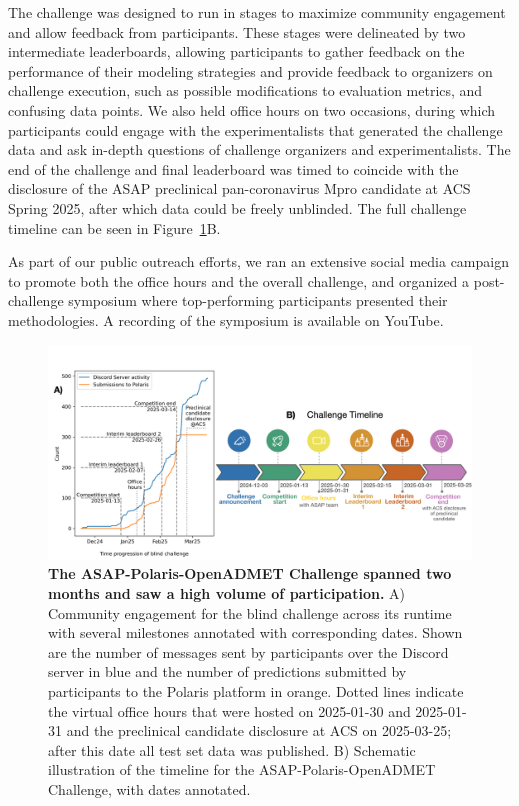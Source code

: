 \documentclass[journal=jcim,manuscript=article]{achemso}
\begin{document}
The challenge was designed to run in stages to maximize community engagement and allow feedback from participants. These stages were delineated by two intermediate leaderboards, allowing participants to gather feedback on the performance of their modeling strategies and provide feedback to organizers on challenge execution, such as possible modifications to evaluation metrics, and confusing data points. We also held office hours on two occasions, during which participants could engage with the experimentalists that generated the challenge data and ask in-depth questions of challenge organizers and experimentalists. The end of the challenge and final leaderboard was timed to coincide with the disclosure of the ASAP preclinical pan-coronavirus Mpro candidate at ACS Spring 2025\cite{griffen_2025_acs}, after which data could be freely unblinded. The full challenge timeline can be seen in Figure~\ref{fgr:timeline_engagement}B.

As part of our public outreach efforts, we ran an extensive social media campaign to promote both the office hours and the overall challenge, and organized a post-challenge symposium where top-performing participants presented their methodologies. A recording of the symposium is available on YouTube\cite{openadmet_asap_workshop}. 


\begin{figure}
    \includegraphics[scale=0.58]{02_figs_community/community_progress_and_timeline.png}
  \caption{\textbf{The ASAP-Polaris-OpenADMET Challenge spanned two months and saw a high volume of participation.} A) Community engagement for the blind challenge across its runtime with several milestones annotated with corresponding dates. Shown are the number of messages sent by participants over the Discord server in blue and the number of predictions submitted by participants to the Polaris platform in orange. Dotted lines indicate the virtual office hours that were hosted on 2025-01-30 and 2025-01-31 and the preclinical candidate disclosure at ACS on 2025-03-25; after this date all test set data was published. B) Schematic illustration of the timeline for the ASAP-Polaris-OpenADMET Challenge, with dates annotated.}
  \label{fgr:timeline_engagement}
\end{figure}
\end{document}
